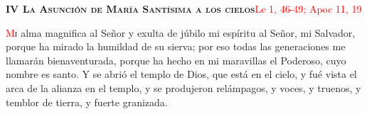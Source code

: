 \noindent\textbf{\textsc{IV La Asunción de María Santísima a los cielos}}\hfill\textcolor{red}{Lc 1, 46-49; Apoc 11, 19}

\vspace{0.25em}

\lettrine[lines=2]{\textcolor{red}{M}}i alma magnifica al Señor y exulta de júbilo mi espíritu al Señor, mi Salvador, porque ha mirado la humildad de su sierva;
por eso todas las generaciones me llamarán bienaventurada, porque ha hecho en mi maravillas el Poderoso, cuyo nombre es santo. Y se abrió el templo de Dios, que está en el cielo,
y fué vista el arca de la alianza en el templo, y se produjeron relámpagos, y voces, y truenos, y temblor de tierra, y fuerte granizada.